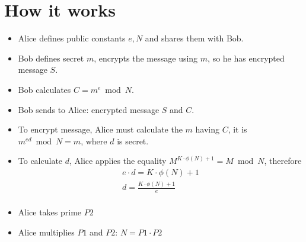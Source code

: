 \section{How it works}\label{sec:how-it-works}
\begin{itemize}
    \item Alice defines public constants $e, N$ and shares them with Bob.
    \item Bob defines secret $m$, encrypts the message using $m$, so he has encrypted message $S$.
    \item Bob calculates $C = m^e \bmod N$.
    \item Bob sends to Alice: encrypted message $S$ and $C$.
    \item To encrypt message, Alice must calculate the $m$ having $C$, it is $m^{ed} \bmod N = m$, where $d$ is secret.
    \item To calculate $d$, Alice applies the equality $M^{K \cdot \phi(N) + 1} = M \bmod N$, therefore
    \begin{gather*}
        e \cdot d = K \cdot \phi(N) + 1\\
        d = \frac{K \cdot \phi(N) + 1}{e}\\
    \end{gather*}
    \item Alice takes prime $P2$
    \item Alice multiplies $P1$ and $P2$: $N = P1\cdot P2$
\end{itemize}